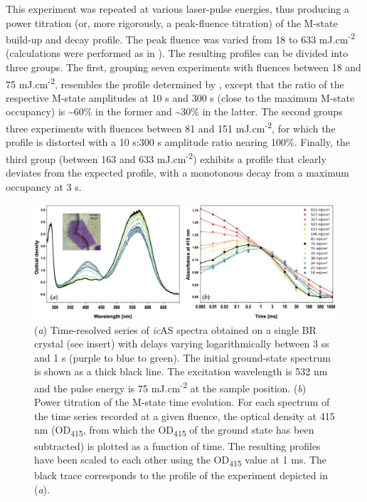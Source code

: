 This experiment was repeated at various laser-pulse energies, thus producing a power titration (or, more rigorously, a peak-fluence titration) of the M-state build-up and decay profile. The peak fluence was varied from 18 to 633 mJ.cm\textsuperscript{-2} (calculations were performed as in \cite{nasskovacsThreedimensionalViewUltrafast2019}). The resulting profiles can be divided into three groups. The first, grouping seven experiments with fluences between 18 and 75 mJ.cm\textsuperscript{-2}, resembles the profile determined by \cite{efremovTimeResolvedMicrospectroscopySingle2006}, except that the ratio of the respective M-state amplitudes at 10 \textmu s and 300 \textmu s (close to the maximum M-state occupancy) is \textasciitilde60\% in the former and \textasciitilde30\% in the latter. The second groups three experiments with fluences between 81 and 151 mJ.cm\textsuperscript{-2}, for which the profile is distorted with a 10 \textmu s:300 \textmu s amplitude ratio nearing 100\%. Finally, the third group (between 163 and 633 mJ.cm\textsuperscript{-2}) exhibits a profile that clearly deviates from the expected profile, with a monotonous decay from a maximum occupancy at 3 \textmu s.

\begin{figure}[H] %
    \centering
    \noindent \includegraphics[width=\textwidth]{images/Spectroscopy/TRicOS_Fig8.pdf}
    \hfill
    \caption{(\textit{a}) Time-resolved series of \textit{ic}AS spectra obtained on a single BR crystal (see insert) with delays varying logarithmically between 3 \textmu ss and 1 s (purple to blue to green). The initial ground-state spectrum is shown as a thick black line. The excitation wavelength is 532 nm and the pulse energy is 75 mJ.cm\textsuperscript{-2} at the sample position. (\textit{b}) Power titration of the M-state time evolution. For each spectrum of the time series recorded at a given fluence, the optical density at 415 nm (OD\textsubscript{415}, from which the OD\textsubscript{415} of the ground state has been subtracted) is plotted as a function of time. The resulting profiles have been scaled to each other using the OD\textsubscript{415} value at 1 ms. The black trace corresponds to the profile of the experiment depicted in (\textit{a}).}
    \label{fig:TRicOS_results}
\end{figure}

